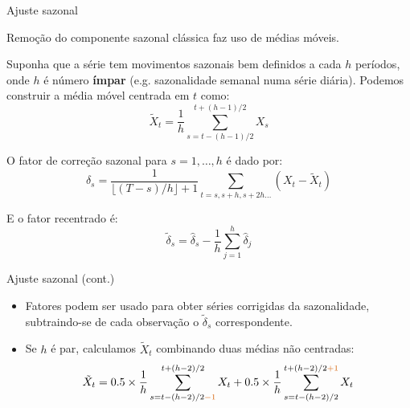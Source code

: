 \documentclass[11pt]{beamer}
\newenvironment{halfwideitemize}{\itemize\addtolength{\itemsep}{0.5em}}{\enditemize}
\begin{document}
\begin{frame}{Ajuste sazonal}
	\begin{halfwideitemize}
		\item Remoção do componente sazonal clássica faz uso de {\color{blue}médias móveis}.
		\item Suponha que a série tem movimentos sazonais bem definidos a cada $h$ períodos, onde $h$ é número \textbf{ímpar} (e.g. sazonalidade semanal numa série diária). Podemos construir a {\color{blue} média móvel centrada em $t$} como:
		\begin{equation}
			\tilde{X}_t = \frac{1}{h}\sum_{s = t - (h-1)/2}^{t+(h-1)/2} X_s
		\end{equation}
		\item O {\color{blue}fator de correção sazonal} para $s=1,\ldots, h$ é dado por:
		\begin{equation}
			\hat{\delta}_s = \frac{1}{\lfloor (T - s)/h\rfloor + 1}\sum_{t = s, s + h, s+ 2h \ldots} (X_t - \tilde{X}_t)
		\end{equation}
		\item E o fator recentrado é:
		\begin{equation}
			\tilde{\delta}_s = \hat{\delta}_s - \frac{1}{h}\sum_{j=1}^h \hat{\delta}_j		
		\end{equation}

		
	\end{halfwideitemize}
	
\end{frame}

\begin{frame}{Ajuste sazonal (cont.)}
	\begin{itemize}
				\item Fatores podem ser usado para obter séries corrigidas da sazonalidade, subtraindo-se de cada observação  o $\tilde{\delta}_s$ correspondente.
		\item Se $h$ é par, calculamos $\tilde{X}_t$ combinando duas médias não centradas:
		$$			\tilde{X}_t =0.5 \times \frac{1}{h}\sum_{s = t - (h-2)/2 {\color{red}- 1}}^{t+(h-2)/2} X_t + 0.5 \times \frac{1}{h}\sum_{s = t - (h-2)/2 }^{t+(h-2)/2{\color{red}+1}} X_t $$
	\end{itemize}
\end{frame}
\end{document}
